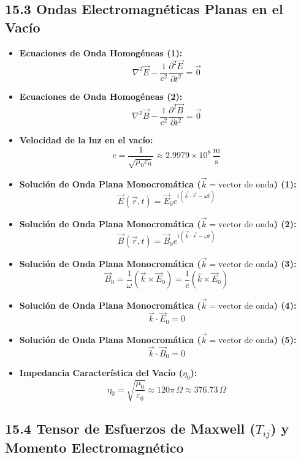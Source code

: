 \documentclass[11pt,a4paper]{article}
\begin{document}
\subsection*{15.3 Ondas Electromagnéticas Planas en el Vacío}

\begin{itemize}
  \item \textbf{Ecuaciones de Onda Homogéneas (1):}
  \[
    \nabla^2 \vec{E} - \frac{1}{c^2} \frac{\partial^2 \vec{E}}{\partial t^2} = \vec{0}
  \]
  \item \textbf{Ecuaciones de Onda Homogéneas (2):}
  \[
    \nabla^2 \vec{B} - \frac{1}{c^2} \frac{\partial^2 \vec{B}}{\partial t^2} = \vec{0}
  \]
  \item \textbf{Velocidad de la luz en el vacío:}
  \[
    c = \frac{1}{\sqrt{\mu_0 \varepsilon_0}} \approx 2.9979 \times 10^8 \, \frac{\mathrm{m}}{\mathrm{s}}
  \]
  \item \textbf{Solución de Onda Plana Monocromática ($\vec{k} = \text{vector de onda}$) (1):}
  \[
    \vec{E}(\vec{r}, t) = \vec{E}_0 e^{i(\vec{k} \cdot \vec{r} - \omega t)}
  \]
  \item \textbf{Solución de Onda Plana Monocromática ($\vec{k} = \text{vector de onda}$) (2):}
  \[
    \vec{B}(\vec{r}, t) = \vec{B}_0 e^{i(\vec{k} \cdot \vec{r} - \omega t)}
  \]
  \item \textbf{Solución de Onda Plana Monocromática ($\vec{k} = \text{vector de onda}$) (3):}
  \[
    \vec{B}_0 = \frac{1}{\omega} (\vec{k} \times \vec{E}_0) = \frac{1}{c} (\hat{k} \times \vec{E}_0)
  \]
  \item \textbf{Solución de Onda Plana Monocromática ($\vec{k} = \text{vector de onda}$) (4):}
  \[
    \vec{k} \cdot \vec{E}_0 = 0
  \]
  \item \textbf{Solución de Onda Plana Monocromática ($\vec{k} = \text{vector de onda}$) (5):}
  \[
    \vec{k} \cdot \vec{B}_0 = 0
  \]
  \item \textbf{Impedancia Característica del Vacío ($\eta_0$):}
  \[
    \eta_0 = \sqrt{\frac{\mu_0}{\varepsilon_0}} \approx 120\pi \, \Omega \approx 376.73 \, \Omega
  \]
\end{itemize}

\subsection*{15.4 Tensor de Esfuerzos de Maxwell ($T_{ij}$) y Momento Electromagnético}
\end{document}
